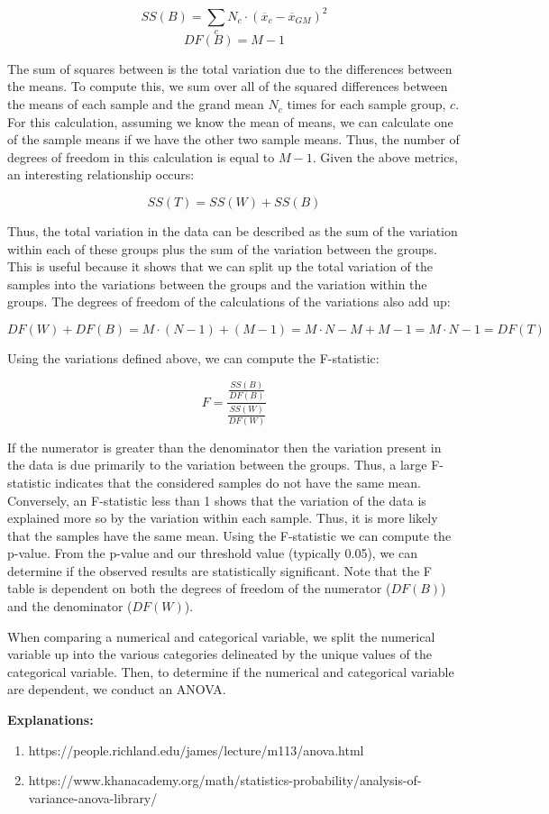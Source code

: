 \documentclass{article}
\begin{document}
\[SS(B) = \sum_{c} N_c \cdot (\overline{x}_c - \overline{x}_{GM})^2\]
\[DF(B) = M - 1\]

\noindent
The sum of squares between is the total variation due to the differences between the means. To compute this, we sum over all of the squared differences between the means of each sample and the grand mean $N_c$ times for each sample group, $c$. For this calculation, assuming we know the mean of means, we can calculate one of the sample means if we have the other two sample means. Thus, the number of degrees of freedom in this calculation is equal to $M - 1$. Given the above metrics, an interesting relationship occurs:

\[SS(T) = SS(W) + SS(B)\]

\noindent
Thus, the total variation in the data can be described as the sum of the variation within each of these groups plus the sum of the variation between the groups. This is useful because it shows that we can split up the total variation of the samples into the variations between the groups and the variation within the groups. The degrees of freedom of the calculations of the variations also add up:

\[DF(W) + DF(B) = M \cdot (N - 1) + (M - 1) = M \cdot N - M + M - 1 = M \cdot N - 1 = DF(T)\]

\noindent
Using the variations defined above, we can compute the F-statistic:

\[F  = \frac{\frac{SS(B)}{DF(B)}}{\frac{SS(W)}{DF(W)}}\]

\noindent
If the numerator is greater than the denominator then the variation present in the data is due primarily to the variation between the groups. Thus, a large F-statistic indicates that the considered samples do not have the same mean. Conversely, an F-statistic less than 1 shows that the variation of the data is explained more so by the variation within each sample. Thus, it is more likely that the samples have the same mean. Using the F-statistic we can compute the p-value. From the p-value and our threshold value (typically 0.05), we can determine if the observed results are statistically significant. Note that the F table is dependent on both the degrees of freedom of the numerator ($DF(B)$) and the denominator ($DF(W)$). 

\noindent
When comparing a numerical and categorical variable, we split the numerical variable up into the various categories delineated by the unique values of the categorical variable. Then, to determine if the numerical and categorical variable are dependent, we conduct an ANOVA.  

\vspace{3mm}
\textbf{Explanations:}
\begin{enumerate}
\item https://people.richland.edu/james/lecture/m113/anova.html
\item https://www.khanacademy.org/math/statistics-probability/analysis-of-variance-anova-library/
\end{enumerate}
\end{document}
